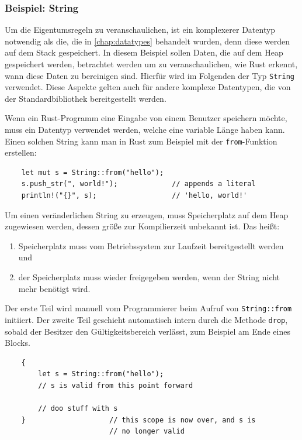 \subsubsection{Beispiel: String}

Um die Eigentumsregeln zu veranschaulichen, ist ein komplexerer Datentyp not\-wen\-dig als die, die in \autoref{chap:datatypes} behandelt wurden, denn diese werden auf dem Stack gespeichert. In diesem Beispiel sollen Daten, die auf dem Heap gespeichert werden, betrachtet werden um zu veranschaulichen, wie Rust erkennt, wann diese Daten zu bereinigen sind. Hierfür wird im Folgenden der Typ \verb"String" verwendet. Diese Aspekte gelten auch für andere komplexe Datentypen, die von der Standardbibliothek bereitgestellt werden.

Wenn ein Rust-Programm eine Eingabe von einem Benutzer speichern möchte, muss ein Datentyp verwendet werden, welche eine variable Länge haben kann. Einen solchen String kann man in Rust zum Beispiel mit der \verb"from"-Funktion erstellen:

\begin{lstlisting}
    let mut s = String::from("hello");
    s.push_str(", world!");             // appends a literal
    println!("{}", s);                  // 'hello, world!'
\end{lstlisting}

Um einen veränderlichen String zu erzeugen, muss Speicherplatz auf dem Heap zugewiesen werden, dessen größe zur Kompilierzeit unbekannt ist. Das heißt:

\begin{enumerate}
    \item Speicherplatz muss vom Betriebssystem zur Laufzeit bereitgestellt werden und
    \item der Speicherplatz muss wieder freigegeben werden, wenn der String nicht mehr benötigt wird.
\end{enumerate}

Der erste Teil wird manuell vom Programmierer beim Aufruf von \verb"String::from" initiiert. Der zweite Teil geschieht automatisch intern durch die Methode \verb"drop", sobald der Besitzer den Gültigkeitsbereich verlässt, zum Beispiel am Ende eines Blocks.

\begin{lstlisting}
    {
        let s = String::from("hello");
        // s is valid from this point forward
    
        // doo stuff with s
    }                    // this scope is now over, and s is
                         // no longer valid
\end{lstlisting}

